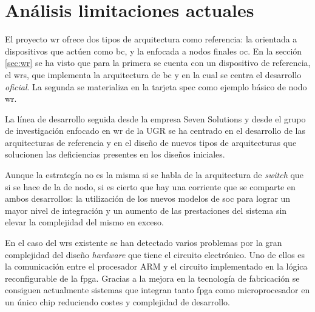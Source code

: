 \chapter{Análisis limitaciones actuales} \label{cap:cadena}


El proyecto \gls{wr} ofrece dos tipos de arquitectura como referencia: la 
orientada a dispositivos que actúen como \gls{bc}, y la enfocada a nodos 
finales \gls{oc}. En la sección \ref{sec:wr}  
se ha visto que para la primera se cuenta 
con un dispositivo de referencia, el \gls{wrs}, que implementa la arquitectura 
de \gls{bc} y en la cual se centra el desarrollo \textit{oficial}. La segunda 
se materializa en la tarjeta \gls{spec} como ejemplo básico de nodo \gls{wr}.

La línea de desarrollo seguida desde la empresa Seven Solutions y desde el 
grupo de investigación enfocado en \gls{wr} de la UGR se ha centrado en el 
desarrollo de las arquitecturas de referencia y en el diseño de nuevos tipos de 
arquitecturas que solucionen las deficiencias presentes en los diseños 
iniciales.


Aunque la estrategía no es la misma si se habla de la arquitectura de 
\textit{switch} que si se hace de la de nodo, si es cierto que hay una 
corriente que se comparte en ambos desarrollos: la utilización de los nuevos 
modelos de \gls{soc} para lograr un mayor nivel de integración y un aumento de 
las prestaciones del sistema sin elevar la complejidad del mismo en exceso.

En el caso del \gls{wrs} existente se han detectado varios problemas por la 
gran complejidad del diseño \textit{hardware} que tiene el circuito 
electrónico. 
Uno de ellos es la comunicación entre el procesador ARM y el circuito  
implementado en la lógica reconfigurable de la \gls{fpga}. Gracias a la mejora 
en la 
tecnología de fabricación se consiguen actualmente sistemas que integran tanto 
\gls{fpga} como microprocesador en un único chip reduciendo costes y 
complejidad de desarrollo.

